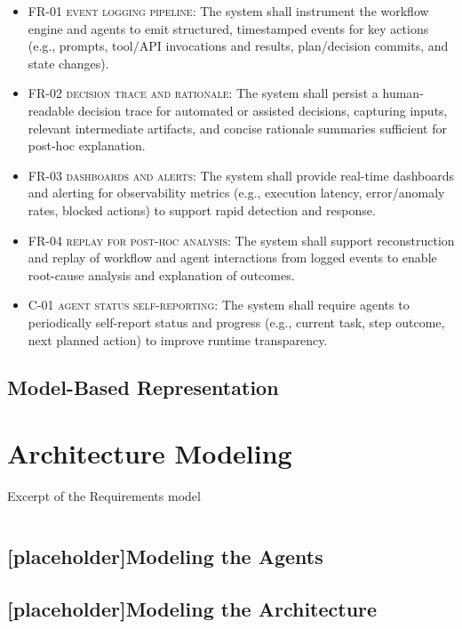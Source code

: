 \begin{itemize}
  \item \textsc{FR-01 event logging pipeline}: The system shall instrument the workflow engine and agents to emit structured, timestamped events for key actions (e.g., prompts, tool/API invocations and results, plan/decision commits, and state changes).
  \item \textsc{FR-02 decision trace and rationale}: The system shall persist a human-readable decision trace for automated or assisted decisions, capturing inputs, relevant intermediate artifacts, and concise rationale summaries sufficient for post-hoc explanation.
  \item \textsc{FR-03 dashboards and alerts}: The system shall provide real-time dashboards and alerting for observability metrics (e.g., execution latency, error/anomaly rates, blocked actions) to support rapid detection and response.
  \item \textsc{FR-04 replay for post-hoc analysis}: The system shall support reconstruction and replay of workflow and agent interactions from logged events to enable root-cause analysis and explanation of outcomes.
  \item \textsc{C-01 agent status self-reporting}: The system shall require agents to periodically self-report status and progress (e.g., current task, step outcome, next planned action) to improve runtime transparency.
\end{itemize}

\subsection{Model-Based Representation}\label{subsec:req-model}

\section{Architecture Modeling}\label{sec:mod-mas}
\begin{listing}[h]
    \caption{Excerpt of the Requirements model}
    \inputminted[firstline=1,lastline=25]{text}{ressources/models/requirements.sysml}
\end{listing}
\subsection{[placeholder]Modeling the Agents}\label{subsec:mod-agents}
\subsection{[placeholder]Modeling the Architecture}\label{subsec:mod-arch}
